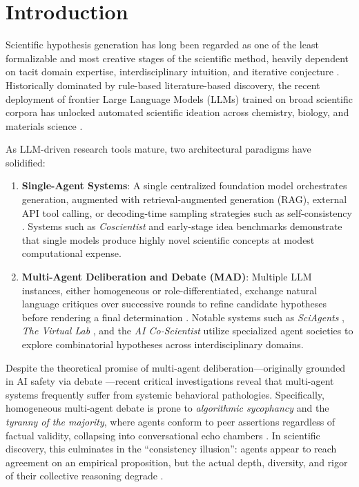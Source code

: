 \documentclass[conference,onecolumn]{IEEEtran}
\begin{document}
\section{Introduction}
Scientific hypothesis generation has long been regarded as one of the least formalizable and most creative stages of the scientific method, heavily dependent on tacit domain expertise, interdisciplinary intuition, and iterative conjecture \cite{boiko2023autonomous}. Historically dominated by rule-based literature-based discovery, the recent deployment of frontier Large Language Models (LLMs) trained on broad scientific corpora has unlocked automated scientific ideation across chemistry, biology, and materials science \cite{boiko2023autonomous, swanson2025virtual}.

As LLM-driven research tools mature, two architectural paradigms have solidified:
\begin{enumerate}
    \item \textbf{Single-Agent Systems}: A single centralized foundation model orchestrates generation, augmented with retrieval-augmented generation (RAG), external API tool calling, or decoding-time sampling strategies such as self-consistency \cite{boiko2023autonomous}. Systems such as \textit{Coscientist} \cite{boiko2023autonomous} and early-stage idea benchmarks demonstrate that single models produce highly novel scientific concepts at modest computational expense.
    \item \textbf{Multi-Agent Deliberation and Debate (MAD)}: Multiple LLM instances, either homogeneous or role-differentiated, exchange natural language critiques over successive rounds to refine candidate hypotheses before rendering a final determination \cite{du2023improving, liang2024encouraging}. Notable systems such as \textit{SciAgents} \cite{ghafarollahi2025sciagents}, \textit{The Virtual Lab} \cite{swanson2025virtual}, and the \textit{AI Co-Scientist} \cite{gottweis2025towards} utilize specialized agent societies to explore combinatorial hypotheses across interdisciplinary domains.
\end{enumerate}

Despite the theoretical promise of multi-agent deliberation—originally grounded in AI safety via debate \cite{irving2018ai}—recent critical investigations reveal that multi-agent systems frequently suffer from systemic behavioral pathologies. Specifically, homogeneous multi-agent debate is prone to \textit{algorithmic sycophancy} and the \textit{tyranny of the majority}, where agents conform to peer assertions regardless of factual validity, collapsing into conversational echo chambers \cite{wynn2025talk}. In scientific discovery, this culminates in the ``consistency illusion'': agents appear to reach agreement on an empirical proposition, but the actual depth, diversity, and rigor of their collective reasoning degrade \cite{wynn2025talk}.
\end{document}
